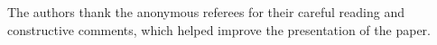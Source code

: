 \documentclass[11pt, reqno]{amsart}
\theoremstyle{definition}
\numberwithin{equation}{section}
\begin{document}
The authors thank the anonymous referees for their careful reading and constructive comments, which helped improve the presentation of the paper.





\newcommand{\noopsort}[1]{}\def\cprime{$'$}
\def\soft#1{\leavevmode\setbox0=\hbox{h}\dimen7=\ht0\advance \dimen7
	by-1ex\relax\if t#1\relax\rlap{\raise.6\dimen7
		\hbox{\kern.3ex\char'47}}#1\relax\else\if T#1\relax
	\rlap{\raise.5\dimen7\hbox{\kern1.3ex\char'47}}#1\relax \else\if
	d#1\relax\rlap{\raise.5\dimen7\hbox{\kern.9ex \char'47}}#1\relax\else\if
	D#1\relax\rlap{\raise.5\dimen7 \hbox{\kern1.4ex\char'47}}#1\relax\else\if
	l#1\relax \rlap{\raise.5\dimen7\hbox{\kern.4ex\char'47}}#1\relax \else\if
	L#1\relax\rlap{\raise.5\dimen7\hbox{\kern.7ex
			\char'47}}#1\relax\else\message{accent \string\soft \space #1 not
		defined!}#1\relax\fi\fi\fi\fi\fi\fi}
\end{document}
